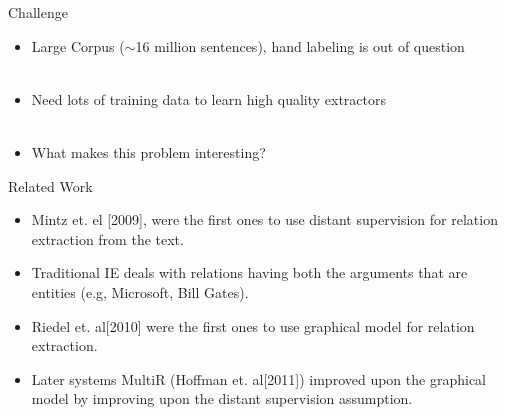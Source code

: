 \documentclass{beamer}
\begin{document}
\begin{frame}{Challenge}
 \begin{itemize}
  \item Large Corpus ($\sim$16 million sentences), hand labeling is out of question \pause \\~\\
  \item Need lots of training data to learn high quality extractors \pause \\~\\
  \item What makes this problem interesting?
 \end{itemize}
\end{frame}


\begin{frame}{Related Work}
 \begin{itemize}
 \setlength \itemsep{2em}
  \item Mintz et. el [2009], were the first ones to use distant supervision for relation extraction from the text.
  \item Traditional IE deals with relations having both the arguments that are entities (e.g, Microsoft, Bill Gates).
  \item Riedel et. al[2010] were the first ones to use graphical model for relation extraction.
  \item Later systems MultiR (Hoffman et. al[2011]) improved upon the graphical model by improving upon the distant supervision assumption.
  
 \end{itemize}
\end{frame}




\end{document}
